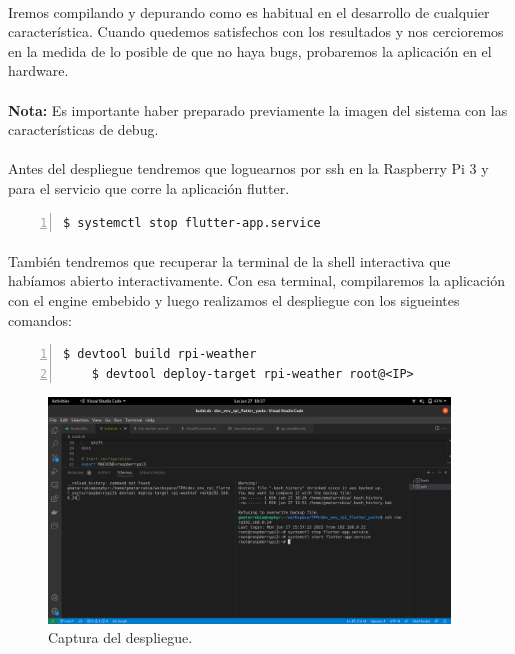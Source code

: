 \paragraph{}Iremos compilando y depurando como es habitual en el desarrollo de cualquier
característica. Cuando quedemos satisfechos con los resultados y nos cercioremos en la
medida de lo posible de que no haya bugs, probaremos la aplicación en el hardware.

\paragraph{}\textbf{Nota:} Es importante haber preparado previamente la imagen del sistema
con las características de debug.

\paragraph{}Antes del despliegue tendremos que loguearnos por ssh en la Raspberry Pi 3
y para el servicio que corre la aplicación flutter.

\begin{lstlisting}[style=consola, numbers=left]
    $ systemctl stop flutter-app.service
\end{lstlisting}

\paragraph{}También tendremos que recuperar la terminal de la shell interactiva que habíamos
abierto interactivamente. Con esa terminal, compilaremos la aplicación con el engine
embebido y luego realizamos el despliegue con los sigueintes comandos:

\begin{lstlisting}[style=consola, numbers=left]
    $ devtool build rpi-weather
    $ devtool deploy-target rpi-weather root@<IP>
\end{lstlisting}

\begin{figure}[H]
    \centering
    \includegraphics[width=0.95\textwidth]{imgs/dev3}
    \caption[Captura del despliegue.]{Captura del despliegue.}
    \label{imgs:deploy-target}
\end{figure}

